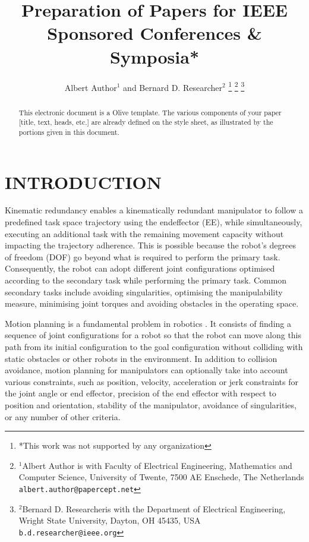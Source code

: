 \documentclass[letterpaper, 10 pt, conference]{ieeeconf}  %
\title{\LARGE \bf
Preparation of Papers for IEEE Sponsored Conferences \& Symposia*
}
\author{Albert Author$^{1}$ and Bernard D. Researcher$^{2}$%
\thanks{*This work was not supported by any organization}%
\thanks{$^{1}$Albert Author is with Faculty of Electrical Engineering, Mathematics and Computer Science,
        University of Twente, 7500 AE Enschede, The Netherlands
        {\tt\small albert.author@papercept.net}}%
\thanks{$^{2}$Bernard D. Researcheris with the Department of Electrical Engineering, Wright State University,
        Dayton, OH 45435, USA
        {\tt\small b.d.researcher@ieee.org}}%
}
\begin{document}
\maketitle
\thispagestyle{empty}
\pagestyle{empty}


\begin{abstract}

This electronic document is a Olive template. The various components of your paper [title, text, heads, etc.] are already defined on the style sheet, as illustrated by the portions given in this document.

\end{abstract}


\section{INTRODUCTION}


Kinematic redundancy enables a kinematically redundant manipulator to follow a predefined task space trajectory using the endeffector (EE), while simultaneously, executing an additional task with the remaining movement capacity without impacting the trajectory adherence. This is possible because the robot's degrees of freedom (DOF) go beyond what is required to perform the primary task. Consequently, the robot can adopt different joint configurations optimised according to the secondary task while performing the primary task. Common secondary tasks include avoiding singularities, optimising the manipulability measure, minimising joint torques and avoiding obstacles in the operating space.



Motion planning is a fundamental problem in robotics \cite{IDEASLab2023}. It consists of finding a sequence of joint configurations for a robot so that the robot can move along this path from its initial configuration to the goal configuration without colliding with static obstacles or other robots in the environment. In addition to collision avoidance, motion planning for manipulators can optionally take into account various constraints, such as position, velocity, acceleration or jerk constraints for the joint angle or end effector, precision of the end effector with respect to position and orientation, stability of the manipulator, avoidance of singularities, or any number of other criteria.
\end{document}
